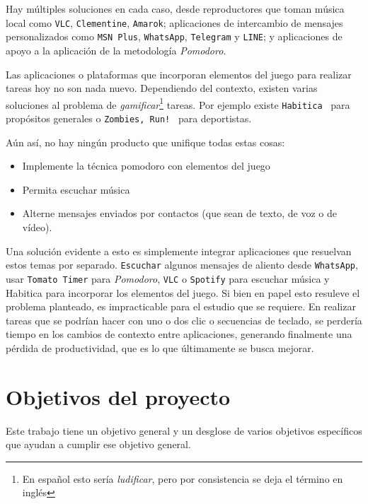 \documentclass[12pt,letterpaper]{report}
\providecommand{\tightlist}{%
  \setlength{\itemsep}{0pt}\setlength{\parskip}{0pt}}
\begin{document}
Hay múltiples soluciones en cada caso,
%
desde reproductores que toman música local como \texttt{VLC},
\texttt{Clementine}, \texttt{Amarok}; 
%
aplicaciones de intercambio de mensajes personalizados como \texttt{MSN Plus}, \texttt{WhatsApp},
\texttt{Telegram} y \texttt{LINE}; y
%
aplicaciones de apoyo a la aplicación de la metodología \emph{Pomodoro}. 

Las aplicaciones o plataformas que incorporan elementos del juego para realizar
tareas hoy no son nada nuevo. Dependiendo del contexto, existen varias
soluciones al problema de \emph{gamificar}\footnote{En español esto sería
\emph{ludificar}, pero por consistencia se deja el término en inglés} tareas. Por
ejemplo existe \texttt{Habitica}~\cite{habitica} para propósitos generales o
\texttt{Zombies, Run!}~\cite{zombiesrun} para deportistas.

Aún así, no hay ningún producto que unifique todas estas cosas:

\begin{itemize}
\tightlist
\item
  Implemente la técnica pomodoro con elementos del juego
\item
  Permita escuchar música
\item
  Alterne mensajes  enviados por contactos (que sean de texto, de voz o de vídeo).
\end{itemize}

Una solución evidente a esto es simplemente integrar aplicaciones que resuelvan
estos temas por separado. \texttt{Escuchar} algunos mensajes de aliento desde
\texttt{WhatsApp}, usar \texttt{Tomato Timer} para \emph{Pomodoro},
\texttt{VLC} o \texttt{Spotify} para escuchar música y Habitica para incorporar
los elementos del juego. Si bien en papel esto resuleve el problema planteado,
es impracticable para el estudio que se requiere. En realizar tareas que se
podrían hacer con uno o dos clic o secuencias de teclado, se perdería tiempo en
los cambios de contexto entre aplicaciones, generando finalmente una pérdida de
productividad, que es lo que últimamente se busca mejorar.

\newpage
\hypertarget{objetivos-del-proyecto}{%
\section{Objetivos del proyecto}\label{objetivos-del-proyecto}}

Este trabajo tiene un objetivo general y un desglose de varios objetivos
específicos que ayudan a cumplir ese objetivo general.
\end{document}
